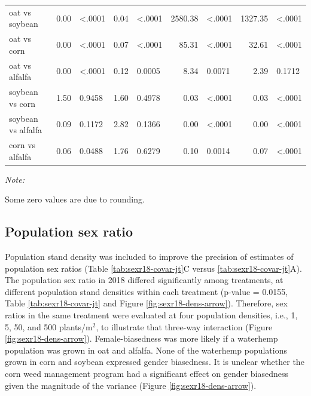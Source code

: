 \documentclass[
]{article}
\begin{document}
\begin{table}
\begin{threeparttable}
\begin{tabular}[t]{lrlr>{}l|rlrl}
\hspace{1em}oat vs soybean & 0.00 & <.0001 & 0.04 & <.0001 & 2580.38 & <.0001 & 1327.35 & <.0001\\
\hspace{1em}oat vs corn & 0.00 & <.0001 & 0.07 & <.0001 & 85.31 & <.0001 & 32.61 & <.0001\\
\hspace{1em}oat vs alfalfa & 0.00 & <.0001 & 0.12 & 0.0005 & 8.34 & 0.0071 & 2.39 & 0.1712\\
\hspace{1em}soybean vs corn & 1.50 & 0.9458 & 1.60 & 0.4978 & 0.03 & <.0001 & 0.03 & <.0001\\
\hspace{1em}soybean vs alfalfa & 0.09 & 0.1172 & 2.82 & 0.1366 & 0.00 & <.0001 & 0.00 & <.0001\\
\hspace{1em}corn vs alfalfa & 0.06 & 0.0488 & 1.76 & 0.6279 & 0.10 & 0.0014 & 0.07 & <.0001\\
\bottomrule
\end{tabular}
\begin{tablenotes}[para]
\item \textit{Note: } 
\item Some zero values are due to rounding.
\end{tablenotes}
\end{threeparttable}
\end{table}

\hypertarget{population-sex-ratio-1}{%
\subsection*{Population sex ratio}\label{population-sex-ratio-1}}

Population stand density was included to improve the precision of estimates of population sex ratios (Table \ref{tab:sexr18-covar-jt}C versus \ref{tab:sexr18-covar-jt}A). The population sex ratio in 2018 differed significantly among treatments, at different population stand densities within each treatment (p-value = 0.0155, Table \ref{tab:sexr18-covar-jt} and Figure \ref{fig:sexr18-dens-arrow}). Therefore, sex ratios in the same treatment were evaluated at four population densities, i.e., 1, 5, 50, and 500 plants/m\(^2\), to illustrate that three-way interaction (Figure \ref{fig:sexr18-dens-arrow}). Female-biasedness was more likely if a waterhemp population was grown in oat and alfalfa. None of the waterhemp populations grown in corn and soybean expressed gender biasedness. It is unclear whether the corn weed management program had a significant effect on gender biasedness given the magnitude of the variance (Figure \ref{fig:sexr18-dens-arrow}).
\end{document}
